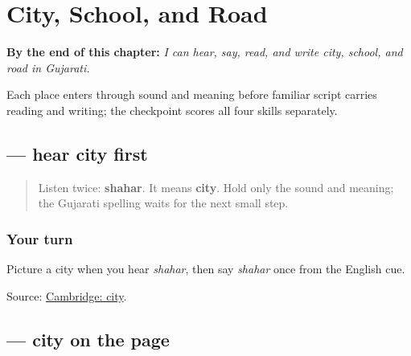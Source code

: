 
\chapter{City, School, and Road}
\label{ch:gu-city-school-road}

\begin{chapteropening}
\textbf{By the end of this chapter:} \emph{I can hear, say, read, and write city, school, and road in Gujarati.}

Each place enters through sound and meaning before familiar script carries reading and writing; the checkpoint scores all four skills separately.
\end{chapteropening}

\section[\texorpdfstring{\gu{શહેર} (shahar)}{શહેર (shahar)}]{ — hear city first}

\label{lesson:GU-C22-hear-shahar}



\begin{quote}
Listen twice: \textbf{shahar}. It means \textbf{city}. Hold only the sound and meaning; the Gujarati spelling waits for the next small step.
\end{quote}

\subsection*{Your turn}
Picture a city when you hear \emph{shahar}, then say \emph{shahar} once from the English cue.

\begin{tcolorbox}[breakable,colback=teal!4,colframe=teal!35!black,title={Before you move on}]
Source: \href{https://dictionary.cambridge.org/dictionary/english-gujarati/city}{Cambridge: city}.
\end{tcolorbox}
\section[\texorpdfstring{\gu{શહેર} (shahar)}{શહેર (shahar)}]{ — city on the page}

